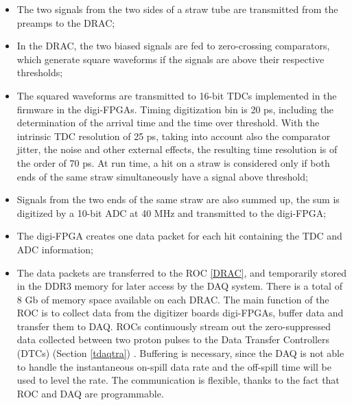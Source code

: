\begin{itemize}
    \item The two signals from the two sides of a straw tube are transmitted 
    from the preamps to the DRAC;
    \item In the DRAC, the two biased signals are fed to zero-crossing comparators, 
      which generate square waveforms if the signals are above their respective thresholds;
    \item The squared waveforms are transmitted to 16-bit TDCs implemented 
    in the firmware in the digi-FPGAs. Timing digitization bin is 20 ps, including the determination of the arrival time and the 
    time over threshold. 
  With the intrinsic TDC resolution of 25 ps, taking into account also the comparator jitter, 
    the noise and other external effects, the resulting time resolution 
    is of the order of 70 ps. At run time, a hit on a straw 
    is considered only if both ends of the same straw simultaneously have a 
    signal above threshold;
  \item Signals from the two ends of the same straw
    are also summed up, the sum is digitized by a 10-bit 
    ADC at 40 MHz and transmitted to the digi-FPGA;
    \item The digi-FPGA creates one data packet for each hit containing the 
    TDC and ADC information;
    \item The data packets are transferred to the ROC \ref{DRAC}, and 
    temporarily stored in the DDR3 memory for later access by the DAQ system. 
    There is a total of 8 Gb of memory space available on each DRAC. 
    The main function of the ROC is to collect data from the digitizer boards 
    digi-FPGAs, buffer data and transfer them to DAQ. ROCs continuously stream out 
    the zero-suppressed data collected between two proton pulses to 
    the Data Transfer Controllers (DTCs) (Section \ref{tdaqtra}) \cite{GIOIOSA2023167732}.
    Buffering is necessary, since the DAQ is not
    able to handle the instantaneous on-spill data rate and the off-spill time
    will be used to level the rate.
    The communication is flexible, thanks to the fact that ROC and DAQ are programmable.

\end{itemize}

